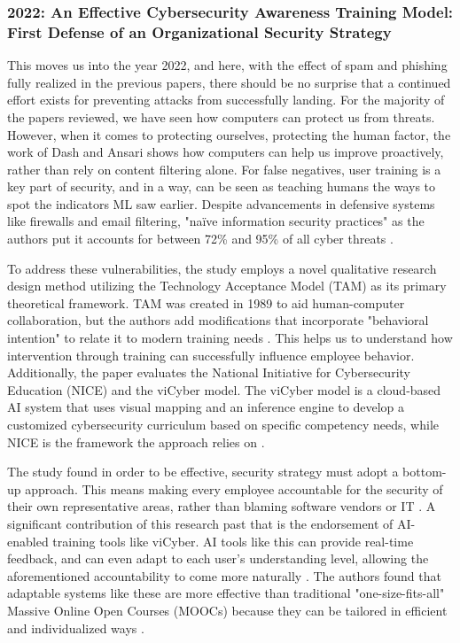 \documentclass[conference]{IEEEtran}
\begin{document}
\subsubsection{2022: An Effective Cybersecurity Awareness Training Model: First Defense of an Organizational Security Strategy}
This moves us into the year 2022, and here, with the effect of spam and phishing fully realized in the previous papers, there should be no surprise that a continued effort exists for preventing attacks from successfully landing.
For the majority of the papers reviewed, we have seen how computers can protect us from threats.
However, when it comes to protecting ourselves, protecting the human factor, the work of Dash and Ansari shows how computers can help us improve proactively, rather than rely on content filtering alone.
For false negatives, user training is a key part of security, and in a way, can be seen as teaching humans the ways to spot the indicators ML saw earlier.
Despite advancements in defensive systems like firewalls and email filtering, "naïve information security practices" as the authors put it accounts for between 72\% and 95\% of all cyber threats \cite{dash1}.

To address these vulnerabilities, the study employs a novel qualitative research design method utilizing the Technology Acceptance Model (TAM) as its primary theoretical framework. 
TAM was created in 1989 to aid human-computer collaboration, but the authors add modifications that incorporate "behavioral intention" to relate it to modern training needs \cite{dash1}.
This helps us to understand how intervention through training can successfully influence employee behavior.
Additionally, the paper evaluates the National Initiative for Cybersecurity Education (NICE) and the viCyber model.
The viCyber model is a cloud-based AI system that uses visual mapping and an inference engine to develop a customized cybersecurity curriculum based on specific competency needs, while NICE is the framework the approach relies on \cite{dash1}.

The study found in order to be effective, security strategy must adopt a bottom-up approach.
This means making every employee accountable for the security of their own representative areas, rather than blaming software vendors or IT \cite{dash1}.
A significant contribution of this research past that is the endorsement of AI-enabled training tools like viCyber.
AI tools like this can provide real-time feedback, and can even adapt to each user's understanding level, allowing the aforementioned accountability to come more naturally \cite{dash1}.
The authors found that adaptable systems like these are more effective than traditional "one-size-fits-all" Massive Online Open Courses (MOOCs) because they can be tailored in efficient and individualized ways \cite{dash1}.
\end{document}
